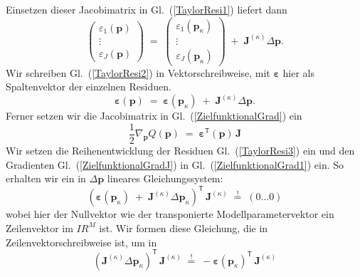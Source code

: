 Einsetzen dieser Jacobimatrix in Gl.~(\ref{TaylorResi1}) liefert dann
\begin{equation}
\left(\begin{array}{c}
\varepsilon_1(\mathbf{p}) \\
\vdots \\
\varepsilon_J(\mathbf{p})
\end{array}\right)
\; = \;
\left(\begin{array}{c}
\varepsilon_1(\mathbf{p}_\kappa) \\
\vdots \\
\varepsilon_J(\mathbf{p}_\kappa)
\end{array}\right)
\; + \; \boldsymbol{J}^{(\kappa)} \Delta \mathbf{p} .
\label{TaylorResi2}
\end{equation}
Wir schreiben Gl.~(\ref{TaylorResi2}) in Vektorschreibweise, mit $\boldsymbol{\varepsilon}$ hier als Spaltenvektor
der einzelnen Residuen.
\begin{equation}
\boldsymbol{\varepsilon}(\mathbf{p})
\; = \;
\boldsymbol{\varepsilon}(\mathbf{p}_\kappa)
\; + \; \boldsymbol{J}^{(\kappa)} \Delta \mathbf{p} .
\label{TaylorResi3}
\end{equation}
Ferner setzen wir die Jacobimatrix in Gl.~(\ref{ZielfunktionalGrad}) ein
\begin{equation}
\frac{1}{2} \nabla_{\mathbf{p}} Q(\mathbf{p})  \; = \; \boldsymbol{\varepsilon}^\textsf{T}(\mathbf{p})
 \, \boldsymbol{J}
\label{ZielfunktionalGradJ}
\end{equation}
Wir setzen die Reihenentwicklung der Residuen Gl.~(\ref{TaylorResi3}) ein und
den Gradienten Gl.~(\ref{ZielfunktionalGradJ}) in Gl.~(\ref{ZielfunktionalGrad1}) ein.
So erhalten wir ein in $\Delta \mathbf{p}$ lineares Gleichungssystem:
\begin{equation}
\left( \boldsymbol{\varepsilon}(\mathbf{p}_\kappa)
\; + \; \boldsymbol{J}^{(\kappa)} \Delta \mathbf{p}_\kappa \right)^\textsf{T} \, \boldsymbol{J}^{(\kappa)}
\; \overset{!}{=} \; \left( 0 \dots  0 \right)
\label{GradientQlinGl1}
\end{equation}
wobei hier der Nullvektor wie der transponierte Modellparametervektor ein
Zeilenvektor im $I \! \! R^{M}$ ist.
Wir formen diese Gleichung, die in Zeilenvektorschreibweise ist, um in
\begin{equation}
\left( \boldsymbol{J}^{(\kappa)} \Delta \mathbf{p}_\kappa \right)^\textsf{T} \, \boldsymbol{J}^{(\kappa)}
\; \overset{!}{=} \;
- \boldsymbol{\varepsilon}(\mathbf{p}_\kappa)^\textsf{T} \, \boldsymbol{J}^{(\kappa)}
\label{GradientQlinGl2}
\end{equation}

